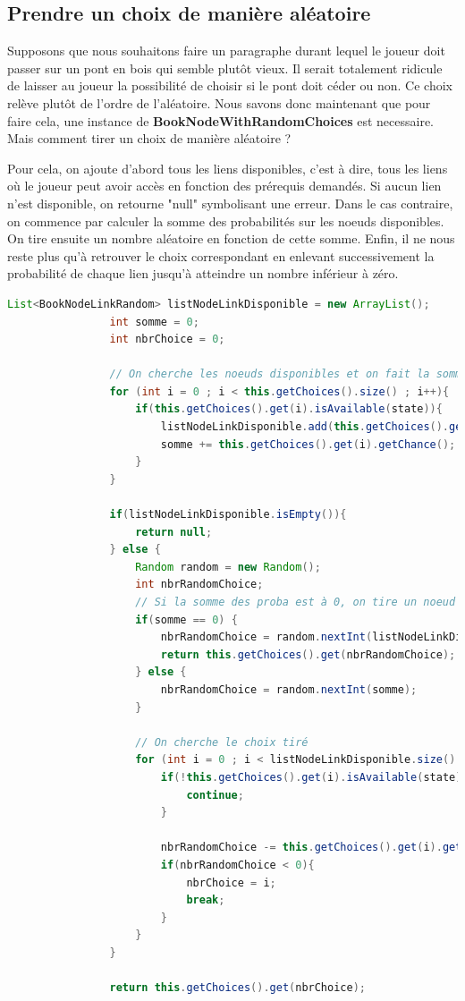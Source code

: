 		\subsection{Prendre un choix de manière aléatoire}

			Supposons que nous souhaitons faire un paragraphe durant lequel le joueur doit passer sur un pont en bois qui semble plutôt vieux. Il serait totalement ridicule de laisser au joueur la possibilité de choisir si le pont doit céder ou non. Ce choix relève plutôt de l'ordre de l'aléatoire. Nous savons donc maintenant que pour faire cela, une instance de \textbf{BookNodeWithRandomChoices} est necessaire. Mais comment tirer un choix de manière aléatoire ?

			Pour cela, on ajoute d'abord tous les liens disponibles, c'est à dire, tous les liens où le joueur peut avoir accès en fonction des prérequis demandés. Si aucun lien n'est disponible, on retourne "null" symbolisant une erreur. Dans le cas contraire, on commence par calculer la somme des probabilités sur les noeuds disponibles. On tire ensuite un nombre aléatoire en fonction de cette somme. Enfin, il ne nous reste plus qu'à retrouver le choix correspondant en enlevant successivement la probabilité de chaque lien jusqu'à atteindre un nombre inférieur à zéro.

			\begin{lstlisting}[gobble=16, language=java, label=lst:getRandomChoices, caption=getRandomChoice()]
				List<BookNodeLinkRandom> listNodeLinkDisponible = new ArrayList();
				int somme = 0;
				int nbrChoice = 0;

				// On cherche les noeuds disponibles et on fait la somme des probabilités
				for (int i = 0 ; i < this.getChoices().size() ; i++){
					if(this.getChoices().get(i).isAvailable(state)){
						listNodeLinkDisponible.add(this.getChoices().get(i));
						somme += this.getChoices().get(i).getChance();
					}
				}

				if(listNodeLinkDisponible.isEmpty()){
					return null;
				} else {
					Random random = new Random();
					int nbrRandomChoice;
					// Si la somme des proba est à 0, on tire un noeud au hasard
					if(somme == 0) {
						nbrRandomChoice = random.nextInt(listNodeLinkDisponible.size());
						return this.getChoices().get(nbrRandomChoice);
					} else {
						nbrRandomChoice = random.nextInt(somme);
					}

					// On cherche le choix tiré
					for (int i = 0 ; i < listNodeLinkDisponible.size() ; i++){
						if(!this.getChoices().get(i).isAvailable(state)){
							continue;
						}

						nbrRandomChoice -= this.getChoices().get(i).getChance();
						if(nbrRandomChoice < 0){
							nbrChoice = i;
							break;
						}
					}
				}

				return this.getChoices().get(nbrChoice);
			\end{lstlisting}

